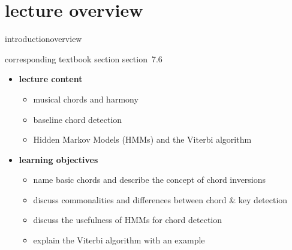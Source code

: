 


\subtitle{module 7.6: chord detection}


	

    \section[overview]{lecture overview}
        \begin{frame}{introduction}{overview}
            \begin{block}{corresponding textbook section}
                    section~7.6
            \end{block}

            \begin{itemize}
                \item   \textbf{lecture content}
                    \begin{itemize}
                        \item   musical chords and harmony
                        \item   baseline chord detection
                        \item   Hidden Markov Models (HMMs) and the Viterbi algorithm
                    \end{itemize}
                \bigskip
                \item<2->   \textbf{learning objectives}
                    \begin{itemize}
                        \item   name basic chords and describe the concept of chord inversions
                        \item   discuss commonalities and differences between chord \& key detection
                        \item   discuss the usefulness of HMMs for chord detection
                        \item   explain the Viterbi algorithm with an example
                    \end{itemize}
            \end{itemize}
        \end{frame}
        
